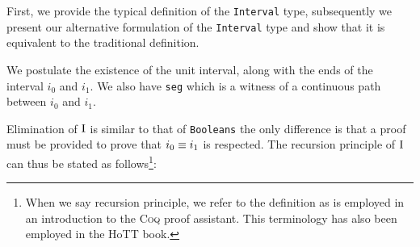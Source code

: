 \documentclass[12pt,twoside,maitrise]{dms}
\theoremstyle{definition}
\numberwithin{equation}{section}
\numberwithin{table}{chapter}
\numberwithin{figure}{chapter}
\newcommand\id[1] {\texttt{#1}}
\def\Coq{\textsc{Coq}\xspace}
\begin{document}
First, we provide the typical definition of the \id{Interval} type, subsequently
we present our alternative formulation of the \id{Interval} type and show that
it is equivalent to the traditional definition.

\begin{prooftree*}
\end{prooftree*}

\begin{prooftree*}
\end{prooftree*}

\begin{prooftree*}
\end{prooftree*}

\begin{prooftree*}
\end{prooftree*}

We postulate the existence of the unit interval, along with the ends of the
interval \id{$i_0$} and \id{$i_1$}. We also have \id{seg} which is a witness of
a continuous path between \id{$i_0$} and \id{$i_1$}.

Elimination of $\mathrm{I}$ is similar to that of \id{Booleans} the only difference is
that a proof must be provided to prove that $\eqtype{i_0}{i_1}$ is respected.
The recursion principle of $\mathrm{I}$ can thus be stated as follows\footnote{When we
say recursion principle, we refer to the definition as is employed in an
introduction to the \Coq{} proof assistant\cite{chlipala2022certified}. This
terminology has also been employed in the HoTT book\cite{HoTTbook}.}:

\begin{prooftree*}
\end{prooftree*}
\end{document}
